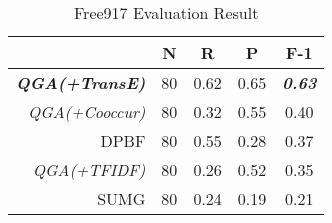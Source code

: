\begin{table} [h]
	\begin{tabular}
		{r | c c c c}
		\hline
		& \textbf{N} & \textbf{R} & \textbf{P} & \textbf{F-1} \\
		\hline
		\textbf{\textit{QGA(+TransE)}} & 80 & 0.62 & 0.65 & \textbf{\textit{0.63}} \\
		\textit{QGA(+Cooccur)}          & 80 & 0.32 & 0.55 & 0.40 \\
		DPBF                         & 80 & 0.55 & 0.28 & 0.37 \\
		\textit{QGA(+TFIDF)}           & 80 & 0.26 & 0.52 & 0.35 \\
		SUMG                         & 80 & 0.24 & 0.19 & 0.21 \\
		\hline
	\end{tabular}
	\caption{Free917 Evaluation Result}
	\label{tab:freebaseres}
	\vspace{-0.4in}
\end{table}

